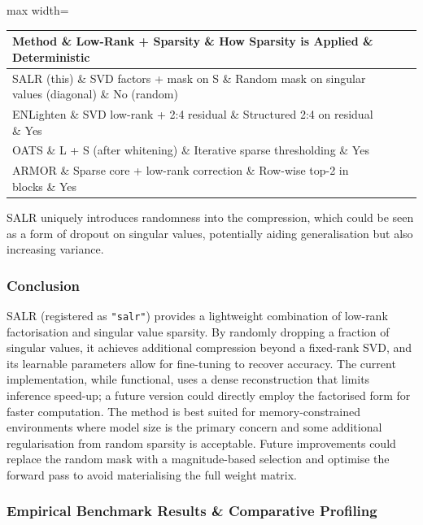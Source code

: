 \begin{center}
\begin{adjustbox}{max width=\columnwidth}
\renewcommand{\arraystretch}{1.2}
\begin{tabular}{llll}
\toprule
Method \& Low-Rank + Sparsity \& How Sparsity is Applied \& Deterministic \\
\midrule
SALR (this) \& SVD factors + mask on S \& Random mask on singular values (diagonal) \& No (random) \\
ENLighten \& SVD low-rank + 2:4 residual \& Structured 2:4 on residual \& Yes \\
OATS \& L + S (after whitening) \& Iterative sparse thresholding \& Yes \\
ARMOR \& Sparse core + low-rank correction \& Row-wise top-2 in blocks \& Yes \\

\bottomrule
\end{tabular}
\end{adjustbox}
\end{center}
SALR uniquely introduces randomness into the compression, which could be seen as a form of dropout on singular values, potentially aiding generalisation but also increasing variance.


\subsubsection*{Conclusion}

SALR (registered as \texttt{"salr"}) provides a lightweight combination of low-rank factorisation and singular value sparsity. By randomly dropping a fraction of singular values, it achieves additional compression beyond a fixed-rank SVD, and its learnable parameters allow for fine-tuning to recover accuracy. The current implementation, while functional, uses a dense reconstruction that limits inference speed-up; a future version could directly employ the factorised form for faster computation. The method is best suited for memory-constrained environments where model size is the primary concern and some additional regularisation from random sparsity is acceptable. Future improvements could replace the random mask with a magnitude-based selection and optimise the forward pass to avoid materialising the full weight matrix.

\subsubsection*{Empirical Benchmark Results \& Comparative Profiling}


